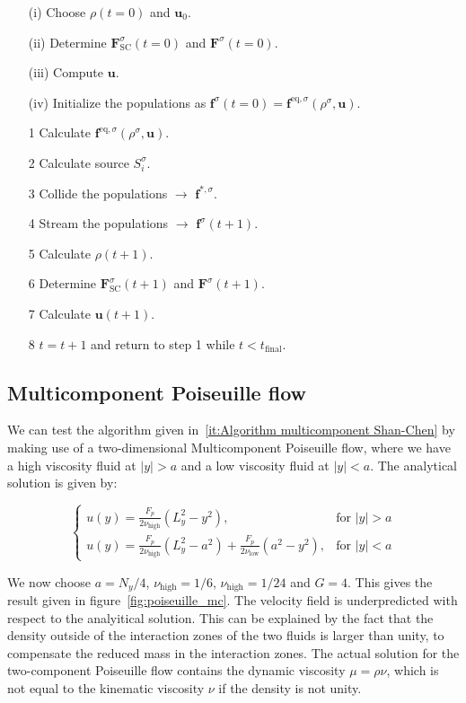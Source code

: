 \begin{itemize}\label{it:Algorithm multicomponent Shan-Chen}
    \item[(i)] Choose $\rho(t=0)$ and $\bm{u}_0$.
    \item[(ii)] Determine $\bm{F}_{\text{SC}}^\sigma(t=0)$ and $\bm{F}^\sigma(t=0)$.
    \item[(iii)] Compute $\bm{u}$. 
    \item[(iv)] Initialize the populations as $\bm{f}^\sigma(t=0) = \bm{f}^{\text{eq}, \sigma}(\rho^\sigma, \bm{u})$. 
    \item[1] Calculate $\bm{f}^{\text{eq}, \sigma}(\rho^\sigma, \bm{u})$.
    \item[2] Calculate source $S_i^\sigma$.
    \item[3] Collide the populations $\rightarrow$ $\bm{f}^{\ast, \sigma}$.
    \item[4] Stream the populations $\rightarrow$ $\bm{f}^\sigma(t + 1)$.
    \item[5] Calculate $\rho(t + 1)$.  
    \item[6] Determine $\bm{F}_{\text{SC}}^\sigma(t+1)$ and $\bm{F}^\sigma(t+1)$.
    \item[7] Calculate $\bm{u}(t + 1)$.
    \item[8] $t = t + 1$ and return to step 1 while $t < t_{\text{final}}$.
\end{itemize}

\subsection{Multicomponent Poiseuille flow}
We can test the algorithm given in~\ref{it:Algorithm multicomponent Shan-Chen} by making use of a two-dimensional Multicomponent Poiseuille flow, where we have a high viscosity fluid at $|y| > a$ and a low viscosity fluid at $|y| < a$. The analytical solution is given by:

\begin{equation}
\begin{cases}
    u(y) = \frac{F_p}{2 \nu_{\text{high}}}\left(L_y^2 - y^2\right), & \text{for } |y| > a\\
    u(y) = \frac{F_p}{2 \nu_{\text{high}}}\left(L_y^2 - a^2\right) + \frac{F_p}{2 \nu_{\text{low}}}\left(a^2 - y^2\right), & \text{for } |y| < a
\end{cases}
\end{equation}

We now choose $a = N_y / 4$, $\nu_{\text{high}} = 1/6$, $\nu_{\text{high}} = 1/24$ and $G = 4$. This gives the result given in figure~\ref{fig:poiseuille_mc}. The velocity field is underpredicted with respect to the analyitical solution. This can be explained by the fact that the density outside of the interaction zones of the two fluids is larger than unity, to compensate the reduced mass in the interaction zones. The actual solution for the two-component Poiseuille flow contains the dynamic viscosity $\mu = \rho \nu$, which is not equal to the kinematic viscosity $\nu$ if the density is not unity. 

